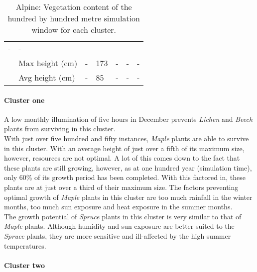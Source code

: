 \begin{table}[]
\begin{tabular}{|p{2cm}|p{2cm}|p{1.5cm}|p{1.5cm}|p{1.5cm}|p{1.5cm}|p{1.5cm}|}
						\multicolumn{1}{l|}{-} & 
						\multicolumn{1}{l|}{-} \\\cline{2-7} &
						\multicolumn{1}{l|}{Max height (cm)} & 
						\multicolumn{1}{l|}{-} &
						\multicolumn{1}{l|}{173} & 
						\multicolumn{1}{l|}{-} &
						\multicolumn{1}{l|}{-} & 
						\multicolumn{1}{l|}{-} \\\cline{2-7} &
						\multicolumn{1}{l|}{Avg height (cm)} & 
						\multicolumn{1}{l|}{-} &
						\multicolumn{1}{l|}{85} & 
						\multicolumn{1}{l|}{-} &
						\multicolumn{1}{l|}{-} & 
						\multicolumn{1}{l|}{-} \\\cline{2-7}
		\hline                                                       
		\end{tabular}
	\label{tab:results_alpine_species_cluster_properties}	
	\caption{Alpine: Vegetation content of the hundred by hundred metre simulation window for each cluster.}
\end{table}

\paragraph{Cluster one}

A low monthly illumination of five hours in December prevents \textit{Lichen} and \textit{Beech} plants from surviving in this cluster.\\
With just over five hundred and fifty instances, \textit{Maple} plants are able to survive in this cluster. With an average height of just over a fifth of its maximum size, however, resources are not optimal. A lot of this comes down to the fact that these plants are still growing, however, as at one hundred year (simulation time), only 60\% of its growth period has been completed. With this factored in, these plants are at just over a third of their maximum size. The factors preventing optimal growth of \textit{Maple} plants in this cluster are too much rainfall in the winter months, too much sun exposure and heat exposure in the summer months.\\
The growth potential of \textit{Spruce} plants in this cluster is very similar to that of \textit{Maple} plants. Although humidity and sun exposure are better suited to the \textit{Spruce} plants, they are more sensitive and ill-affected by the high summer temperatures.

\paragraph{Cluster two}


